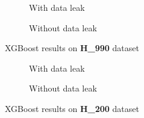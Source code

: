         \begin{figure}[H]
            \centering
            \begin{subfigure}{0.47\textwidth}
              \centering
              \resizebox{\textwidth}{!}{}
              \captionsetup{justification=centering}
              \caption{With data leak}
            \end{subfigure}%
            \hspace{0.05\textwidth}
            \begin{subfigure}{0.47\textwidth}
              \centering
              \resizebox{\textwidth}{!}{}
              \captionsetup{justification=centering}
              \caption{Without data leak}
            \end{subfigure}
            \caption{XGBoost results on \textbf{H\_990} dataset}\label{fig:xgb_h990}
        \end{figure}

        \begin{figure}[H]
            \centering
            \begin{subfigure}{0.45\textwidth}
              \centering
              \resizebox{\textwidth}{!}{}
              \captionsetup{justification=centering}
              \caption{With data leak}
            \end{subfigure}%
            \hspace{0.05\textwidth}
            \begin{subfigure}{0.45\textwidth}
              \centering
              \resizebox{\textwidth}{!}{}
              \captionsetup{justification=centering}
              \caption{Without data leak}
            \end{subfigure}
            \caption{XGBoost results on \textbf{H\_200} dataset}\label{fig:xgb_h200}
        \end{figure}

